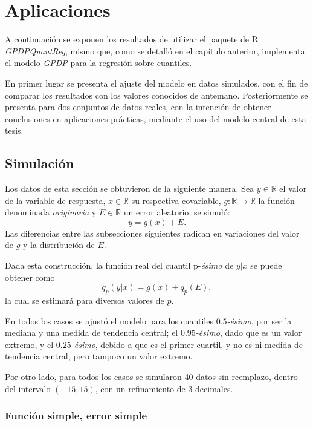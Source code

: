 \chapter[Aplicaciones]{Aplicaciones}

A continuaci\'on se exponen los resultados de utilizar el paquete de R \textit{GPDPQuantReg}, mismo que, como se detalló en el cap\'itulo anterior, implementa el modelo \textit{GPDP} para la regresi\'on sobre cuantiles.

En primer lugar se presenta el ajuste del modelo en datos simulados, con el fin de comparar los resultados con los valores conocidos de antemano. Posteriormente se presenta para dos conjuntos de datos reales, con la intenci\'on de obtener conclusiones en aplicaciones pr\'acticas, mediante el uso del modelo central de esta tesis.

\section{Simulaci\'on}

Los datos de esta secci\'on se obtuvieron de la siguiente manera. Sea $y \in \mathbb{R}$ el valor de la variable de respuesta, $x \in \mathbb{R}$ su respectiva covariable, $g: \mathbb{R} \rightarrow \mathbb{R}$ la funci\'on denominada \textit{originaria} y $E \in \mathbb{R}$ un error aleatorio, se simul\'o:
\begin{equation*}
    y = g(x) + E.
\end{equation*}
Las diferencias entre las subsecciones siguientes radican en variaciones del valor de $g$ y la distribuci\'on de $E$.

Dada esta construcci\'on, la funci\'on real del cuantil p-\textit{\'esimo} de $y|x$ se puede obtener como
\begin{equation*}
    q_p(y|x) = g(x) + q_p(E),
\end{equation*}
la cual se estimar\'a para diversos valores de $p$.

En todos los casos se ajust\'o el modelo para los cuantiles $0.5$\textit{-\'esimo}, por ser la mediana y una medida de tendencia central; el $0.95$\textit{-\'esimo}, dado que es un valor extremo, y el $0.25$\textit{-\'esimo}, debido a que es el primer cuartil, y no es ni medida de tendencia central, pero tampoco un valor extremo.

Por otro lado, para todos los casos se simularon 40 datos sin reemplazo, dentro del intervalo $(-15,15)$, con un refinamiento de 3 decimales.

\subsection{Funci\'on simple, error simple}

